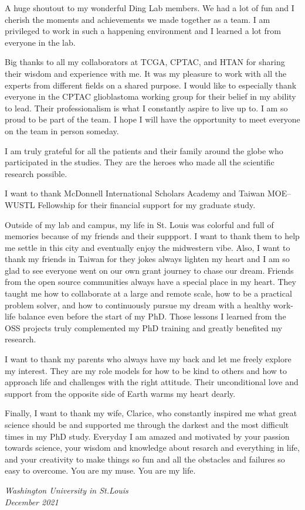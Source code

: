 A huge shoutout to my wonderful Ding Lab members.
We had a lot of fun and I cherish the moments and achievements we made together as a team.
I am privileged to work in such a happening environment and I learned a lot from everyone in the lab.

Big thanks to all my collaborators at TCGA, CPTAC, and HTAN for sharing their wisdom and experience with me.
It was my pleasure to work with all the experts from different fields on a shared purpose.
I would like to especially thank everyone in the CPTAC glioblastoma working group for their belief in my ability to lead.
Their professionalism is what I constantly aspire to live up to.
I am so proud to be part of the team.
I hope I will have the opportunity to meet everyone on the team in person someday.

I am truly grateful for all the patients and their family around the globe who participated in the studies.
They are the heroes who made all the scientific research possible.

I want to thank McDonnell International Scholars Academy and Taiwan MOE--WUSTL Fellowship for their financial support for my graduate study.

Outside of my lab and campus, my life in St. Louis was colorful and full of memories because of my friends and their suppport.
I want to thank them to help me settle in this city and eventually enjoy the midwestern vibe.
Also, I want to thank my friends in Taiwan for they jokes always lighten my heart and I am so glad to see everyone went on our own grant journey to chase our dream.
Friends from the open source communities always have a special place in my heart.
They taught me how to collaborate at a large and remote scale, how to be a practical problem solver, and how to continuously pursue my dream with a healthy work-life balance even before the start of my PhD.
Those lessons I learned from the OSS projects truly complemented my PhD training and greatly benefited my research.

I want to thank my parents who always have my back and let me freely explore my interest.
They are my role models for how to be kind to others and how to approach life and challenges with the right attitude.
Their unconditional love and support from the opposite side of Earth warms my heart dearly.

Finally, I want to thank my wife, Clarice, who constantly inspired me what great science should be and supported me through the darkest and the most difficult times in my PhD study.
Everyday I am amazed and motivated by your passion towards science, your wisdom and knowledge about resarch and everything in life, and your creativity to make things so fun and all the obstacles and failures so easy to overcome.
You are my muse. You are my life.

\null\hfill \thesisauthor

\noindent
\textit{Washington University in St.\@ Louis}\\
\textit{December 2021}
